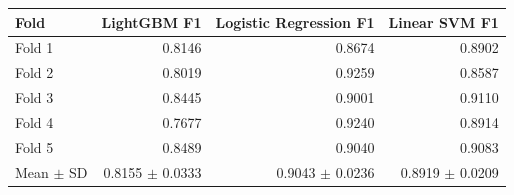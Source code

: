 \begin{tabular}{lrrr}
\toprule
Fold & LightGBM F1 & Logistic Regression F1 & Linear SVM F1 \\
\midrule
    Fold 1 & 0.8146 & 0.8674 & 0.8902 \\
    Fold 2 & 0.8019 & 0.9259 & 0.8587 \\
    Fold 3 & 0.8445 & 0.9001 & 0.9110 \\
    Fold 4 & 0.7677 & 0.9240 & 0.8914 \\
    Fold 5 & 0.8489 & 0.9040 & 0.9083 \\
    \midrule
    Mean $\pm$ SD & 0.8155 $\pm$ 0.0333 & 0.9043 $\pm$ 0.0236 & 0.8919 $\pm$ 0.0209 \\
\bottomrule
\end{tabular}
